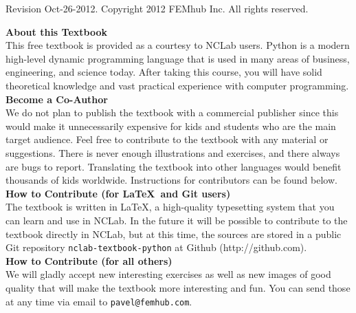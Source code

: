 \documentclass[article,A4,12pt]{llncs}
\newif\iffullversion
\begin{document}
\begin{center}
\end{center}
\vbox{}
\vspace{5mm}
\begin{center}
\iffullversion
\else
\centerline{\huge \color{red}{PREVIEW}}
\fi
\vfill
\end{center}
\vfill
\vfill
\begin{center}
Revision Oct-26-2012. Copyright 2012 FEMhub Inc. All rights reserved.
\end{center}
\newpage
\vbox{}
\vfill
{
\noindent
{\bf About this Textbook}\\[4mm]
This free textbook is provided as a courtesy to NCLab users. 
Python is a modern high-level 
dynamic programming language that is used in many areas of business, 
engineering, and science today. After taking this course, you will 
have solid theoretical knowledge and vast practical experience with 
computer programming. \\[4mm]

\noindent
{\bf Become a Co-Author}\\[4mm]
We do not plan to publish the textbook with a commercial publisher since this 
would make it unnecessarily expensive for kids and students who are the main 
target audience. Feel free to contribute to the textbook with any material or 
suggestions. There is never enough illustrations and exercises, and there always 
are bugs to report. Translating the textbook into other languages would benefit
thousands of kids worldwide. Instructions for contributors can be found 
below.\\[4mm]

\noindent
{\bf How to Contribute (for \LaTeX \ and Git users)}\\[4mm]
\noindent
The textbook is written in \LaTeX, a high-quality typesetting system that 
you can learn and use in NCLab. In the future it will be possible to contribute to 
the textbook directly in NCLab, but at this time, the sources are stored 
in a public Git repository {\tt nclab-textbook-python} at Github (http://github.com). \\[4mm]

\noindent
{\bf How to Contribute (for all others)}\\[4mm]
\noindent
We will gladly accept new interesting exercises as well as
new images of good quality that will make the textbook more interesting and fun. You
can send those at any time via email to {\tt pavel@femhub.com}.\\[4mm]

}
\end{document}
